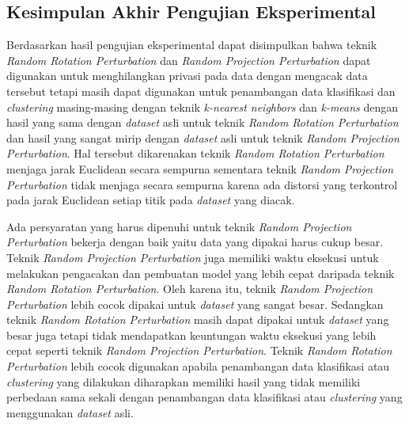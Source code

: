 \subsection{Kesimpulan Akhir Pengujian Eksperimental}
\label{subsec:kesimpulan-eksperimental}

Berdasarkan hasil pengujian eksperimental dapat disimpulkan bahwa teknik \textit{Random Rotation Perturbation} dan \textit{Random Projection Perturbation} dapat digunakan untuk menghilangkan privasi pada data dengan mengacak data tersebut tetapi masih dapat digunakan untuk penambangan data klasifikasi dan \textit{clustering} masing-masing dengan teknik \textit{k-nearest neighbors} dan \textit{k-means} dengan hasil yang sama dengan \textit{dataset} asli untuk teknik \textit{Random Rotation Perturbation} dan hasil yang sangat mirip dengan \textit{dataset} asli untuk teknik \textit{Random Projection Perturbation}. Hal tersebut dikarenakan teknik \textit{Random Rotation Perturbation} menjaga jarak Euclidean secara sempurna sementara teknik \textit{Random Projection Perturbation} tidak menjaga secara sempurna karena ada distorsi yang terkontrol pada jarak Euclidean setiap titik pada \textit{dataset} yang diacak. 

Ada persyaratan yang harus dipenuhi untuk teknik \textit{Random Projection Perturbation} bekerja dengan baik yaitu data yang dipakai harus cukup besar. Teknik \textit{Random Projection Perturbation} juga memiliki waktu eksekusi untuk melakukan pengacakan dan pembuatan model yang lebih cepat daripada teknik \textit{Random Rotation Perturbation}. Oleh karena itu, teknik \textit{Random Projection Perturbation} lebih cocok dipakai untuk \textit{dataset} yang sangat besar. Sedangkan teknik \textit{Random Rotation Perturbation} masih dapat dipakai untuk \textit{dataset} yang besar juga tetapi tidak mendapatkan keuntungan waktu eksekusi yang lebih cepat seperti teknik \textit{Random Projection Perturbation}. Teknik \textit{Random Rotation Perturbation} lebih cocok digunakan apabila penambangan data klasifikasi atau \textit{clustering} yang dilakukan diharapkan memiliki hasil yang tidak memiliki perbedaan sama sekali dengan penambangan data klasifikasi atau \textit{clustering} yang menggunakan \textit{dataset} asli. 